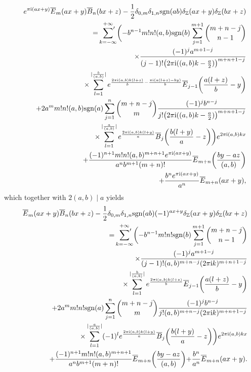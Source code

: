 \documentclass[reqno]{amsart}
\numberwithin{equation}{section}
\begin{document}
\begin{eqnarray*}
&&e^{\pi\mathrm{i}(ax+y)}\overline{E}_{m}(ax+y)\overline{B}_{n}(bx+z)-\frac{1}{2}\delta_{0,m}\delta_{1,n}\mathrm{sgn}(ab)\delta_{\mathbb{Z}}(ax+y)\delta_{\mathbb{Z}}(bx+z)\nonumber\\
&&=\sideset{}{'}\sum_{k=-\infty}^{+\infty}\biggl(-b^{n-1}m!n!(a,b)\mathrm{sgn}(b)\sum_{j=1}^{m+1}
\binom{m+n-j}{n-1}\nonumber\\
&&\qquad\times\frac{(-1)^{j}a^{m+1-j}}{(j-1)!\bigl(2\pi\mathrm{i}((a,b)k-\frac{a}{2})\bigl)^{m+n+1-j}}\nonumber\\
&&\qquad\times\sum_{l=1}^{|\frac{b}{(a,b)}|}e^{\frac{2\pi\mathrm{i}(a,b)k(l+z)}{b}-\frac{\pi\mathrm{i}(a(l+z)-by)}{b}}
\overline{E}_{j-1}\biggl(\frac{a(l+z)}{b}-y\biggl)\nonumber\\
&&\quad+2a^{m}m!n!(a,b)\mathrm{sgn}(a)\sum_{j=1}^{n}\binom{m+n-j}{m}\frac{(-1)^{j}b^{n-j}}{j!\bigl(2\pi\mathrm{i}((a,b)k-\frac{a}{2})\bigl)^{m+n+1-j}}\nonumber\\
&&\qquad\times\sum_{l=1}^{|\frac{a}{(a,b)}|}e^{\frac{2\pi\mathrm{i}(a,b)k(l+y)}{a}}
\overline{B}_{j}\biggl(\frac{b(l+y)}{a}-z\biggl)\biggl)e^{2\pi\mathrm{i}(a,b)kx}\nonumber\\
&&\quad+\frac{(-1)^{n+1}m!n!(a,b)^{m+n+1}e^{\pi\mathrm{i}(ax+y)}}{a^{n}b^{m+1}(m+n)!}\overline{E}_{m+n}\biggl(\frac{by-az}{(a,b)}\biggl)\nonumber\\
&&\quad+\frac{b^{n}e^{\pi\mathrm{i}(ax+y)}}{a^{n}}\overline{E}_{m+n}(ax+y),
\end{eqnarray*}
which together with $2(a,b)\mid a$ yields
\begin{eqnarray}\label{eq4.10}
&&\overline{E}_{m}(ax+y)\overline{B}_{n}(bx+z)-\frac{1}{2}\delta_{0,m}\delta_{1,n}\mathrm{sgn}(ab)(-1)^{ax+y}\delta_{\mathbb{Z}}(ax+y)\delta_{\mathbb{Z}}(bx+z)\nonumber\\
&&=\sideset{}{'}\sum_{k=-\infty}^{+\infty}\biggl(-b^{n-1}m!n!\mathrm{sgn}(b)\sum_{j=1}^{m+1}
\binom{m+n-j}{n-1}\nonumber\\
&&\qquad\times\frac{(-1)^{j}a^{m+1-j}}{(j-1)!(a,b)^{m+n-j}(2\pi\mathrm{i}k)^{m+n+1-j}}\nonumber\\
&&\qquad\times\sum_{l=1}^{|\frac{b}{(a,b)}|}e^{\frac{2\pi\mathrm{i}(a,b)k(l+z)}{b}}
\overline{E}_{j-1}\biggl(\frac{a(l+z)}{b}-y\biggl)\nonumber\\
&&\quad+2a^{m}m!n!\mathrm{sgn}(a)\sum_{j=1}^{n}\binom{m+n-j}{m}\frac{(-1)^{j}b^{n-j}}{j!(a,b)^{m+n-j}(2\pi\mathrm{i}k)^{m+n+1-j}}\nonumber\\
&&\qquad\times\sum_{l=1}^{|\frac{a}{(a,b)}|}(-1)^{l}e^{\frac{2\pi\mathrm{i}(a,b)k(l+y)}{a}}
\overline{B}_{j}\biggl(\frac{b(l+y)}{a}-z\biggl)\biggl)e^{2\pi\mathrm{i}(a,b)kx}\nonumber\\
&&\quad+\frac{(-1)^{n+1}m!n!(a,b)^{m+n+1}}{a^{n}b^{m+1}(m+n)!}\overline{E}_{m+n}\biggl(\frac{by-az}{(a,b)}\biggl)+\frac{b^{n}}{a^{n}}\overline{E}_{m+n}(ax+y).
\end{eqnarray}
\end{document}
